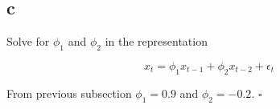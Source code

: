 \subsection{c} 
\label{section_2_c}
Solve for $\phi_1$ and $\phi_2$ in the representation 

\begin{equation}
\nonumber
x_t = \phi_1 x_{t-1} + \phi_2 x_{t-2} + \epsilon_t
\end{equation}

\begin{solution}

From previous subsection $\phi_1 = 0.9$ and $\phi_2 = -0.2$. $\square$ 

\end{solution}